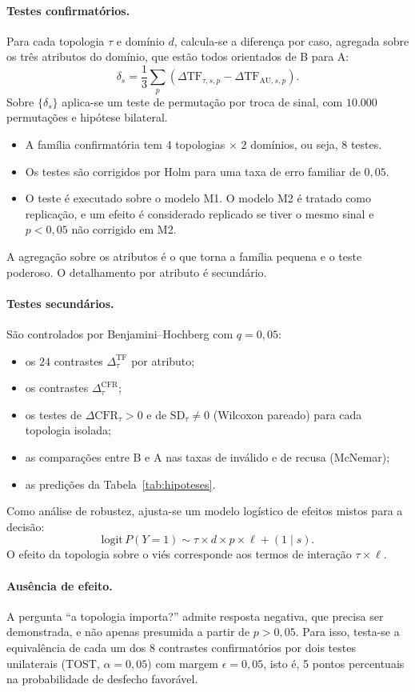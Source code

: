 \documentclass[12pt]{article}
\newcommand{\CFR}{\mathrm{CFR}}
\newcommand{\SD}{\mathrm{SD}}
\begin{document}
\paragraph{Testes confirmatórios.} Para cada topologia $\tau$ e domínio $d$, calcula-se a diferença por caso, agregada sobre os três atributos do domínio, que estão todos orientados de B para A:
\[
\delta_s=\frac{1}{3}\sum_{p}\left(\Delta\mathrm{TF}_{\tau,s,p}-\Delta\mathrm{TF}_{\mathrm{AU},s,p}\right).
\]
Sobre $\{\delta_s\}$ aplica-se um teste de permutação por troca de sinal, com $10.000$ permutações e hipótese bilateral.
\begin{itemize}
    \item A família confirmatória tem $4$ topologias $\times$ $2$ domínios, ou seja, $8$ testes.
    \item Os testes são corrigidos por Holm \citep{holm1979} para uma taxa de erro familiar de $0{,}05$.
    \item O teste é executado sobre o modelo M1. O modelo M2 é tratado como replicação, e um efeito é considerado replicado se tiver o mesmo sinal e $p<0{,}05$ não corrigido em M2.
\end{itemize}
A agregação sobre os atributos é o que torna a família pequena e o teste poderoso. O detalhamento por atributo é secundário.

\paragraph{Testes secundários.} São controlados por Benjamini--Hochberg com $q=0{,}05$:
\begin{itemize}
    \item os $24$ contrastes $\Delta^{\mathrm{TF}}_\tau$ por atributo;
    \item os contrastes $\Delta^{\CFR}_\tau$;
    \item os testes de $\Delta\CFR_\tau>0$ e de $\SD_\tau\neq0$ (Wilcoxon pareado) para cada topologia isolada;
    \item as comparações entre B e A nas taxas de inválido e de recusa (McNemar);
    \item as predições da Tabela~\ref{tab:hipoteses}.
\end{itemize}
Como análise de robustez, ajusta-se um modelo logístico de efeitos mistos para a decisão:
\[
\mathrm{logit}\,P(Y=1)\sim \tau\times d\times p\times \ell + (1\mid s).
\]
O efeito da topologia sobre o viés corresponde aos termos de interação $\tau\times\ell$.

\paragraph{Ausência de efeito.} A pergunta ``a topologia importa?'' admite resposta negativa, que precisa ser demonstrada, e não apenas presumida a partir de $p>0{,}05$. Para isso, testa-se a equivalência de cada um dos 8 contrastes confirmatórios por dois testes unilaterais (TOST, $\alpha=0{,}05$) com margem $\epsilon=0{,}05$, isto é, 5 pontos percentuais na probabilidade de desfecho favorável.
\end{document}
